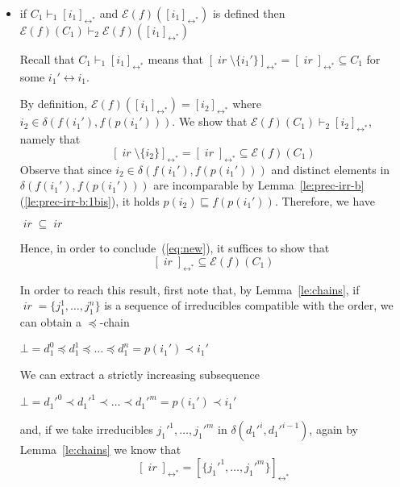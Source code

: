 \documentclass[conference]{IEEEtran}
\renewenvironment{proof}{\begin{IEEEproof}}{\end{IEEEproof}}
\newcommand{\ir}[1]{\ensuremath{\mathop{\mathit{ir}({#1})}}}
\newcommand{\diff}[2]{\ensuremath{\delta({#1},{#2})}}
\newcommand{\pred}[1]{\ensuremath{\mathit{p}({#1})}}
\newcommand{\eqclass}[2][]{\ensuremath{[{#2}]_{\scriptscriptstyle {#1}}}}
\newcommand{\eqclassir}[1]{\ensuremath{\eqclass[\leftrightarrow^*]{#1}}}
\newcommand{\zev}[0]{\ensuremath{\mathcal{E}}}
\newcommand{\ev}[1]{\ensuremath{\zev({#1})}}
\begin{document}
\begin{proof}
\begin{itemize}
   
   \item if $C_1 \vdash_1 \eqclassir{i_1}$ and
     $\ev{f}(\eqclassir{i_1})$ is defined then
     $\ev{f}(C_1) \vdash_2 \ev{f}(\eqclassir{i_1})$

     Recall that $C_1 \vdash_1 \eqclassir{i_1}$ means that 
     $\eqclassir{\ir{i_1'} \setminus \{ i_1'\}} =
     \eqclassir{\ir{\pred{i_1'}}} \subseteq C_1$ for some
     $i_1' \leftrightarrow i_1$.

     By definition, $\ev{f}(\eqclassir{i_1}) = \eqclassir{i_2}$ where
     $i_2 \in \diff{f(i_1')}{f(\pred{i_1'})}$. We show that
     $\ev{f}(C_1) \vdash_2 \eqclassir{i_2}$, namely that
     \begin{equation}
       \label{eq:new}
       \eqclassir{\ir{i_2}\setminus \{ i_2\} } =
       \eqclassir{\ir{\pred{i_2}}} \subseteq \ev{f}(C_1)
     \end{equation}
     Observe that since $i_2 \in \diff{f(i_1')}{f(\pred{i_1'})} $ and
     distinct elements in $\diff{f(i_1')}{f(\pred{i_1'})}$ are
       incomparable by
       Lemma~\ref{le:prec-irr-b}(\ref{le:prec-irr-b:1bis}), it holds
       $\pred{i_2} \sqsubseteq f(\pred{i_1'})$. Therefore, we have
     \begin{center}
       $\ir{\pred{i_2}} \subseteq \ir{f(\pred{i_1'})}$
     \end{center}
     Hence, in order to conclude~(\ref{eq:new}), it suffices to show that
     \begin{equation}
       \label{eq:obj}
       \eqclassir{\ir{f(\pred{i_1'})}} \subseteq \ev{f}(C_1)
     \end{equation}
   
     In order to reach this result, first note that, by
     Lemma~\ref{le:chains}, if
     $\ir{\pred{i_1'}} = \{ j_1^1, \ldots, j_1^n \}$ is a sequence of
     irreducibles compatible with the order, we can obtain a
     $\preceq$-chain
     \begin{center}
       $\bot = d_1^0 \preceq d_1^1 \preceq \ldots \preceq d_1^n =
       \pred{i_1'} \prec i_1'$
     \end{center}
     We can extract a strictly increasing subsequence
     \begin{center}
       $\bot = d_1'^0 \prec d_1'^1 \prec \ldots \prec d_1'^m =
       \pred{i_1'} \prec i_1'$
     \end{center}
     and, if we take irreducibles $j_1'^1, \ldots, j_1'^m$ in
     $\diff{d_1'^{i}}{d_1'^{i-1}}$, again by Lemma~\ref{le:chains} we
     know that
     \begin{equation}
       \label{eq:chain}
       \eqclassir{\ir{\pred{i_1'}}} = \eqclassir{\{j_1'^1, \ldots,
         j_1'^m\}}
     \end{equation}
   

\end{itemize}
\end{proof}
\end{document}
